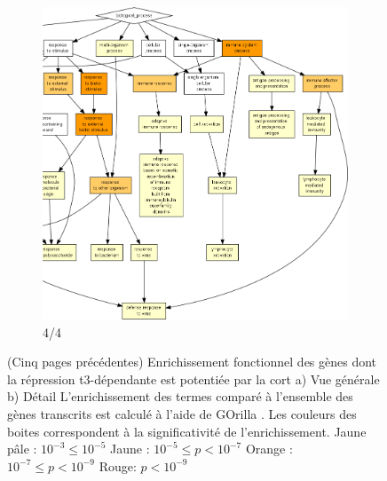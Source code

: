 \begin{figure}[!htp]
\ContinuedFloat
\begin{subfigure}{\textwidth}
\includegraphics[width=\textwidth]
{Figures/hlc-go-pot-down/hlc-go-pot-down_3.png}
\caption{4/4}
\end{subfigure}
\caption[Enrichissement fonctionnel des gènes dont la répression \gls{t3}-dépendante est potentiée par la \gls{cort}]
{
(Cinq pages précédentes) Enrichissement fonctionnel des gènes dont la répression \gls{t3}-dépendante est potentiée par la \gls{cort}
a) Vue générale
b) Détail
L'enrichissement des termes comparé à l'ensemble des gènes transcrits est calculé à l'aide de GOrilla \citep{Eden2009}.
Les couleurs des boites correspondent à la significativité de l'enrichissement.
Jaune pâle : $10^{-3} \leq 10^{-5}$
Jaune : $10^{-5} \leq p < 10^{-7}$
Orange : $10^{-7} \leq p < 10^{-9}$
Rouge: $p < 10^{-9}$
}
\label{fig:hlc-go-pot-down}
\end{figure}